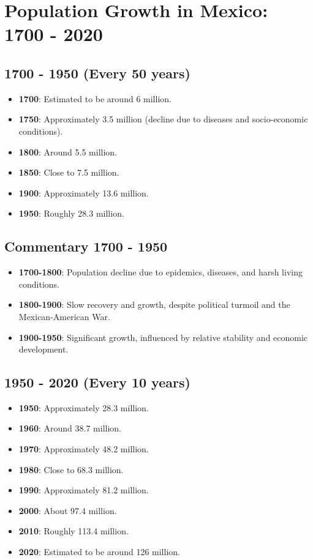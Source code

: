 \section*{Population Growth in Mexico: 1700 - 2020}

\subsection*{1700 - 1950 (Every 50 years)}
\begin{itemize}
    \item \textbf{1700}: Estimated to be around 6 million.
    \item \textbf{1750}: Approximately 3.5 million (decline due to diseases and socio-economic conditions).
    \item \textbf{1800}: Around 5.5 million.
    \item \textbf{1850}: Close to 7.5 million.
    \item \textbf{1900}: Approximately 13.6 million.
    \item \textbf{1950}: Roughly 28.3 million.
\end{itemize}

\subsection*{Commentary 1700 - 1950}
\begin{itemize}
    \item \textbf{1700-1800}: Population decline due to epidemics, diseases, and harsh living conditions.
    \item \textbf{1800-1900}: Slow recovery and growth, despite political turmoil and the Mexican-American War.
    \item \textbf{1900-1950}: Significant growth, influenced by relative stability and economic development.
\end{itemize}

\subsection*{1950 - 2020 (Every 10 years)}
\begin{itemize}
    \item \textbf{1950}: Approximately 28.3 million.
    \item \textbf{1960}: Around 38.7 million.
    \item \textbf{1970}: Approximately 48.2 million.
    \item \textbf{1980}: Close to 68.3 million.
    \item \textbf{1990}: Approximately 81.2 million.
    \item \textbf{2000}: About 97.4 million.
    \item \textbf{2010}: Roughly 113.4 million.
    \item \textbf{2020}: Estimated to be around 126 million.
\end{itemize}

